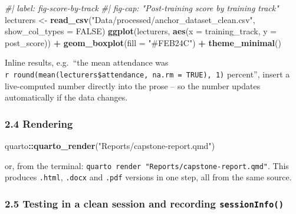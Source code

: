 \documentclass[11pt]{article}
\newenvironment{Shaded}{\begin{snugshade}}{\end{snugshade}}
\newcommand{\AttributeTok}[1]{\textcolor[rgb]{0.13,0.29,0.53}{#1}}
\newcommand{\CommentTok}[1]{\textcolor[rgb]{0.56,0.35,0.01}{\textit{#1}}}
\newcommand{\ConstantTok}[1]{\textcolor[rgb]{0.56,0.35,0.01}{#1}}
\newcommand{\FunctionTok}[1]{\textcolor[rgb]{0.13,0.29,0.53}{\textbf{#1}}}
\newcommand{\NormalTok}[1]{#1}
\newcommand{\OtherTok}[1]{\textcolor[rgb]{0.56,0.35,0.01}{#1}}
\newcommand{\SpecialCharTok}[1]{\textcolor[rgb]{0.81,0.36,0.00}{\textbf{#1}}}
\newcommand{\StringTok}[1]{\textcolor[rgb]{0.31,0.60,0.02}{#1}}
\begin{document}
\begin{Shaded}
\begin{Highlighting}[]
\CommentTok{\#| label: fig{-}score{-}by{-}track}
\CommentTok{\#| fig{-}cap: "Post{-}training score by training track"}
\NormalTok{lecturers }\OtherTok{\textless{}{-}} \FunctionTok{read\_csv}\NormalTok{(}\StringTok{"Data/processed/anchor\_dataset\_clean.csv"}\NormalTok{, }\AttributeTok{show\_col\_types =} \ConstantTok{FALSE}\NormalTok{)}
\FunctionTok{ggplot}\NormalTok{(lecturers, }\FunctionTok{aes}\NormalTok{(}\AttributeTok{x =}\NormalTok{ training\_track, }\AttributeTok{y =}\NormalTok{ post\_score)) }\SpecialCharTok{+}
  \FunctionTok{geom\_boxplot}\NormalTok{(}\AttributeTok{fill =} \StringTok{"\#FEB24C"}\NormalTok{) }\SpecialCharTok{+}
  \FunctionTok{theme\_minimal}\NormalTok{()}
\end{Highlighting}
\end{Shaded}

Inline results, e.g.~``the mean attendance was
\texttt{\textasciigrave{}r\ round(mean(lecturers\$attendance,\ na.rm\ =\ TRUE),\ 1)\textasciigrave{}}
percent'', insert a live-computed number directly into the prose -- so
the number updates automatically if the data changes.

\hypertarget{rendering}{%
\subsubsection{2.4 Rendering}\label{rendering}}

\begin{Shaded}
\begin{Highlighting}[]
\NormalTok{quarto}\SpecialCharTok{::}\FunctionTok{quarto\_render}\NormalTok{(}\StringTok{"Reports/capstone{-}report.qmd"}\NormalTok{)}
\end{Highlighting}
\end{Shaded}

or, from the terminal:
\texttt{quarto\ render\ "Reports/capstone-report.qmd"}. This produces
\texttt{.html}, \texttt{.docx} and \texttt{.pdf} versions in one step,
all from the same source.

\hypertarget{testing-in-a-clean-session-and-recording-sessioninfo}{%
\subsubsection{\texorpdfstring{2.5 Testing in a clean session and
recording
\texttt{sessionInfo()}}{2.5 Testing in a clean session and recording sessionInfo()}}\label{testing-in-a-clean-session-and-recording-sessioninfo}}
\end{document}
